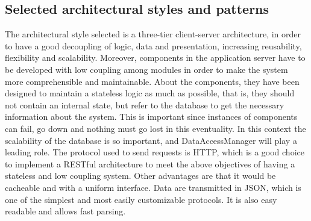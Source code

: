 \subsection{Selected architectural styles and patterns}
The architectural style selected is a three-tier client-server architecture, in order to have a good decoupling of logic, data and presentation, increasing reusability, flexibility and scalability. Moreover, components in the application server have to be developed with low coupling among modules in order to make the system more comprehensible and maintainable. About the components, they have been designed to maintain a stateless logic as much as possible, that is, they should not contain an internal state, but refer to the database to get the necessary information about the system. This is important since instances of components can fail, go down and nothing must go lost in this eventuality. In this context the scalability of the database is so important, and DataAccessManager will play a leading role. 
The protocol used to send requests is HTTP, which is a good choice to implement a RESTful architecture to meet the above objectives of having a stateless and low coupling system. Other advantages are that it would be cacheable and with a uniform interface.
Data are transmitted in JSON, which is one of the simplest and most easily customizable protocols. It is also easy readable and allows fast parsing.\\

